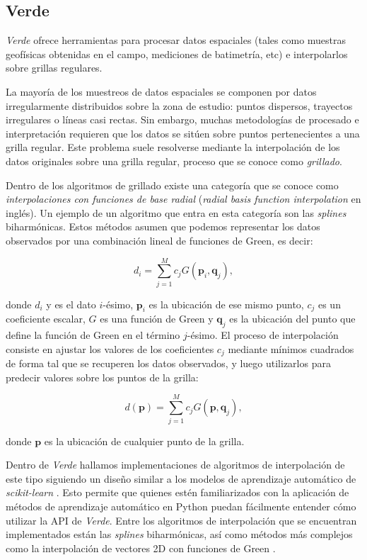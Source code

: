 \subsection{Verde}

\emph{Verde} ofrece herramientas para procesar datos espaciales (tales como
muestras geofísicas obtenidas en el campo, mediciones de batimetría, etc)
e interpolarlos sobre grillas regulares.

La mayoría de los muestreos de datos espaciales se componen por datos
irregularmente distribuidos sobre la zona de estudio:
puntos dispersos, trayectos irregulares o líneas casi rectas.
Sin embargo, muchas metodologías de procesado e interpretación requieren que
los datos se sitúen sobre puntos pertenecientes a una grilla regular.
Este problema suele resolverse mediante la interpolación de los datos
originales sobre una grilla regular, proceso que se conoce como
\emph{grillado}.

Dentro de los algoritmos de grillado existe una categoría que se conoce como
\emph{interpolaciones con funciones de base radial} (\emph{radial basis
function interpolation} en inglés). Un ejemplo de un algoritmo que entra en
esta categoría son las \emph{splines} biharmónicas.
Estos métodos asumen que podemos representar los datos observados por una
combinación lineal de funciones de Green, es decir:

\begin{equation}
    d_i = \sum_{j=1}^M c_j G(\mathbf{p}_i, \mathbf{q}_j),
\end{equation}

\noindent donde $d_i$ y es el dato $i$-ésimo, $\mathbf{p}_i$ es la ubicación de
ese mismo punto, $c_j$ es un coeficiente escalar, $G$ es una función de Green y
$\mathbf{q}_j$ es la ubicación del punto que define la función de Green en el
término $j$-ésimo.
El proceso de interpolación consiste en ajustar los valores de los
coeficientes $c_j$ mediante mínimos cuadrados de forma tal que se recuperen los
datos observados, y luego utilizarlos para predecir valores sobre los puntos de
la grilla:

\begin{equation}
    d(\mathbf{p}) = \sum_{j=1}^M c_j G(\mathbf{p}, \mathbf{q}_j),
\end{equation}

\noindent donde $\mathbf{p}$ es la ubicación de cualquier punto de la grilla.

Dentro de \emph{Verde} hallamos implementaciones de algoritmos de interpolación
de este tipo siguiendo un diseño similar
a los modelos de aprendizaje automático de \emph{scikit-learn}
\citep{sklearn2011}. Esto permite que quienes estén familiarizados con la
aplicación de métodos de aprendizaje automático en Python puedan fácilmente
entender cómo utilizar la \ac{API} de \emph{Verde}.
Entre los algoritmos de interpolación que se encuentran implementados están las
\emph{splines} biharmónicas, así como métodos más complejos como la
interpolación de vectores 2D con funciones de Green \citep{sandwell2016}.

